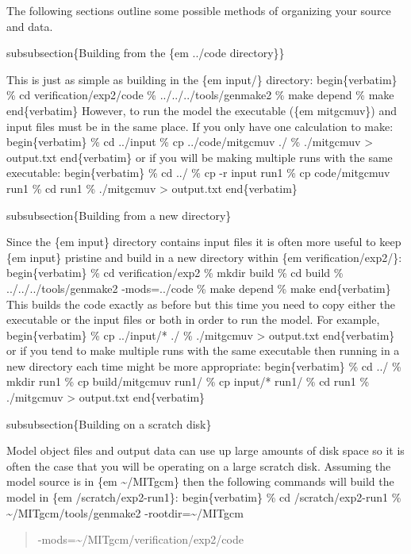 \documentclass[letterpaper,10pt,english]{sphinxmanual}
\begin{document}
The following sections outline some possible methods of organizing
your source and data.

subsubsection\{Building from the \{em ../code directory\}\}

This is just as simple as building in the \{em input/\} directory:
begin\{verbatim\}
\% cd verification/exp2/code
\% ../../../tools/genmake2
\% make depend
\% make
end\{verbatim\}
However, to run the model the executable (\{em mitgcmuv\}) and input
files must be in the same place. If you only have one calculation to make:
begin\{verbatim\}
\% cd ../input
\% cp ../code/mitgcmuv ./
\% ./mitgcmuv \textgreater{} output.txt
end\{verbatim\}
or if you will be making multiple runs with the same executable:
begin\{verbatim\}
\% cd ../
\% cp -r input run1
\% cp code/mitgcmuv run1
\% cd run1
\% ./mitgcmuv \textgreater{} output.txt
end\{verbatim\}

subsubsection\{Building from a new directory\}

Since the \{em input\} directory contains input files it is often more
useful to keep \{em input\} pristine and build in a new directory
within \{em verification/exp2/\}:
begin\{verbatim\}
\% cd verification/exp2
\% mkdir build
\% cd build
\% ../../../tools/genmake2 -mods=../code
\% make depend
\% make
end\{verbatim\}
This builds the code exactly as before but this time you need to copy
either the executable or the input files or both in order to run the
model. For example,
begin\{verbatim\}
\% cp ../input/* ./
\% ./mitgcmuv \textgreater{} output.txt
end\{verbatim\}
or if you tend to make multiple runs with the same executable then
running in a new directory each time might be more appropriate:
begin\{verbatim\}
\% cd ../
\% mkdir run1
\% cp build/mitgcmuv run1/
\% cp input/* run1/
\% cd run1
\% ./mitgcmuv \textgreater{} output.txt
end\{verbatim\}

subsubsection\{Building on a scratch disk\}

Model object files and output data can use up large amounts of disk
space so it is often the case that you will be operating on a large
scratch disk. Assuming the model source is in \{em \textasciitilde{}/MITgcm\} then the
following commands will build the model in \{em /scratch/exp2-run1\}:
begin\{verbatim\}
\% cd /scratch/exp2-run1
\% \textasciitilde{}/MITgcm/tools/genmake2 -rootdir=\textasciitilde{}/MITgcm 
\begin{quote}

-mods=\textasciitilde{}/MITgcm/verification/exp2/code
\end{quote}
\end{document}

